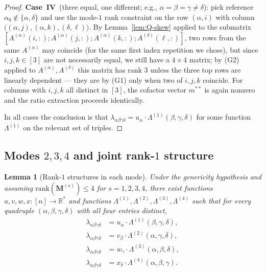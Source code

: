 \documentclass[12pt]{article}
\newtheorem{lemma}[theorem]{Lemma}
\theoremstyle{definition}
\begin{document}
\begin{proof}
\textbf{Case~IV}\, (three equal, one different; e.g., $\alpha=\beta=\gamma\neq\delta$): pick
reference $\alpha_0\notin\{\alpha,\delta\}$ and use the mode-$1$ rank constraint on the row
$(\alpha,i)$ with column $\bigl((\alpha,j),(\alpha,k),(\delta,\ell)\bigr)$. By
Lemma~\ref{lem:Q-skew} applied to the submatrix
$[A^{(\alpha)}(i,:);A^{(\alpha)}(j,:);A^{(\alpha)}(k,:);A^{(\delta)}(\ell,:)]$, two rows from
the same $A^{(\alpha)}$ may coincide (for the same first index repetition we chose), but
since $i,j,k\in[3]$ are not necessarily equal, we still have a $4\times 4$ matrix; by (G2)
applied to $A^{(\alpha)},A^{(\delta)}$ this matrix has rank $3$ unless the three top rows
are linearly dependent — they are by (G1) only when two of $i,j,k$ coincide. For columns
with $i,j,k$ all distinct in $[3]$, the cofactor vector $m^{**}$ is again nonzero and the
ratio extraction proceeds identically.

In all cases the conclusion is that
$\lambda_{\alpha\beta\gamma\delta}=u_\alpha\cdot\Lambda^{(1)}(\beta,\gamma,\delta)$ for some
function $\Lambda^{(1)}$ on the relevant set of triples.
\end{proof}

\subsection{Modes $2,3,4$ and joint rank-$1$ structure}\label{sec:reverse-other-modes}

\begin{lemma}[Rank-$1$ structures in each mode]\label{lem:rank1-each-mode}
Under the genericity hypothesis and assuming $\mathrm{rank}(\mathbf{M}^{(s)})\leq 4$ for
$s=1,2,3,4$, there exist functions $u,v,w,x:[n]\to\mathbb{R}^*$ and functions
$\Lambda^{(1)},\Lambda^{(2)},\Lambda^{(3)},\Lambda^{(4)}$ such that for every quadruple
$(\alpha,\beta,\gamma,\delta)$ with all four entries distinct,
\begin{align}
\lambda_{\alpha\beta\gamma\delta}&=u_\alpha\cdot\Lambda^{(1)}(\beta,\gamma,\delta),\label{eq:r1-alpha}\\
\lambda_{\alpha\beta\gamma\delta}&=v_\beta\cdot\Lambda^{(2)}(\alpha,\gamma,\delta),\label{eq:r1-beta}\\
\lambda_{\alpha\beta\gamma\delta}&=w_\gamma\cdot\Lambda^{(3)}(\alpha,\beta,\delta),\label{eq:r1-gamma}\\
\lambda_{\alpha\beta\gamma\delta}&=x_\delta\cdot\Lambda^{(4)}(\alpha,\beta,\gamma).\label{eq:r1-delta}
\end{align}
\end{lemma}
\end{document}

